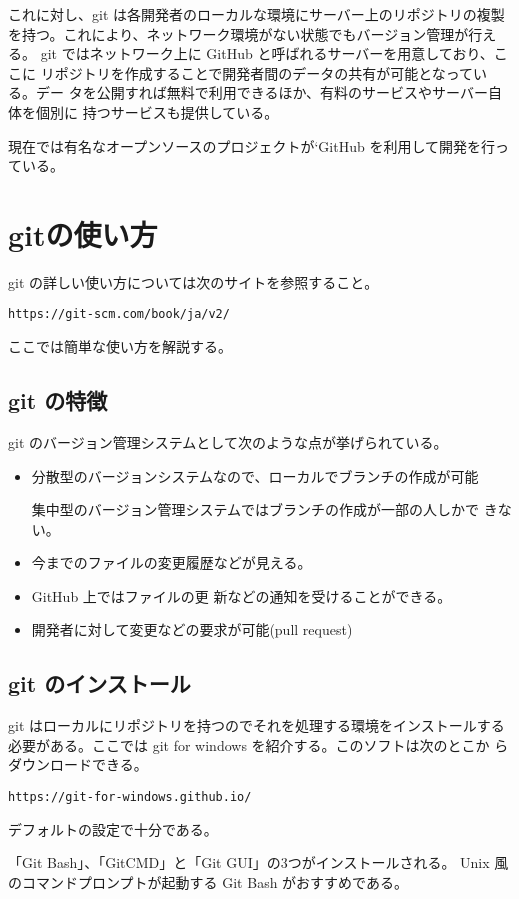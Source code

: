 これに対し、git は各開発者のローカルな環境にサーバー上のリポジトリの複製
を持つ。これにより、ネットワーク環境がない状態でもバージョン管理が行える。
git ではネットワーク上に GitHub と呼ばれるサーバーを用意しており、ここに
リポジトリを作成することで開発者間のデータの共有が可能となっている。デー
タを公開すれば無料で利用できるほか、有料のサービスやサーバー自体を個別に
持つサービスも提供している。

現在では有名なオープンソースのプロジェクトが`GitHub を利用して開発を行っ
ている。
\section{gitの使い方}
git の詳しい使い方については次のサイトを参照すること。

\Verb+https://git-scm.com/book/ja/v2/+

ここでは簡単な使い方を解説する。

\subsection{git の特徴}
git のバージョン管理システムとして次のような点が挙げられている。
\begin{itemize}
 \item 分散型のバージョンシステムなので、ローカルでブランチの作成が可能

       集中型のバージョン管理システムではブランチの作成が一部の人しかで
       きない。
 \item 今までのファイルの変更履歴などが見える。
 \item  GitHub 上ではファイルの更
       新などの通知を受けることができる。
 \item 開発者に対して変更などの要求が可能(pull request)
\end{itemize}

\subsection{git のインストール}
git はローカルにリポジトリを持つのでそれを処理する環境をインストールする
必要がある。ここでは git for windows を紹介する。このソフトは次のとこか
らダウンロードできる。

\Verb+https://git-for-windows.github.io/+

デフォルトの設定で十分である。

「Git Bash」、「GitCMD」と「Git GUI」の3つがインストールされる。
Unix 風のコマンドプロンプトが起動する Git Bash がおすすめである。

